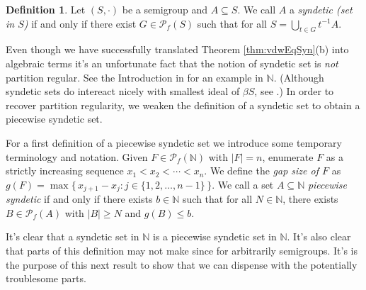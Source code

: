\documentclass[12pt]{article}
\theoremstyle{plain}
\theoremstyle{definition}
\newtheorem{defn}[thm]{Definition}
\newcommand{\bbN}{\mathbb{N}}
\newcommand{\Pf}{\mathcal{P}_f}
\begin{document}
\begin{defn}
  Let $(S, \cdot)$ be a semigroup and $A \subseteq S$.
  We call $A$ a \textsl{syndetic (set in $S$)} if and only if there exist $G \in \Pf(S)$ such that for all $S = \bigcup_{t \in G} t^{-1}A$. 
\end{defn}

Even though we have successfully translated Theorem \ref{thm:vdwEqSyn}(b) into algebraic terms it's an unfortunate fact that the notion of syndetic set is \textsl{not} partition regular. 
See the Introduction in \cite{Bergelson:2001fk} for an example in $\bbN$.
(Although syndetic sets do intereact nicely with smallest ideal of $\beta S$, see \cite[Theorems 4.39 and 4.43]{Hindman:1998fk}.)
In order to recover partition regularity, we weaken the definition of a syndetic set to obtain a piecewise syndetic set.
 
For a first definition of a piecewise syndetic set we introduce some temporary terminology and notation.
Given $F \in \Pf(\bbN)$ with $|F| = n$, enumerate $F$ as a strictly increasing sequence $x_1 < x_2 < \cdots < x_n$. 
We define the \textsl{gap size of $F$} as $g(F) = \max\bigr\{\, x_{j+1} - x_j : j \in \{1, 2, \ldots, n-1\} \,\bigl\}$.
We call a set $A \subseteq \bbN$ \textsl{piecewise syndetic} if and only if there exists $b \in \bbN$ such that for all $N \in \bbN$, there exists $B \in \Pf(A)$ with $|B| \ge N$ and $g(B) \le b$.

It's clear that a syndetic set in $\bbN$ is a piecewise syndetic set in $\bbN$.
It's also clear that  parts of this definition may not make since for arbitrarily semigroups.
It's is the purpose of this next result to show that we can dispense with the potentially troublesome parts.
\end{document}
